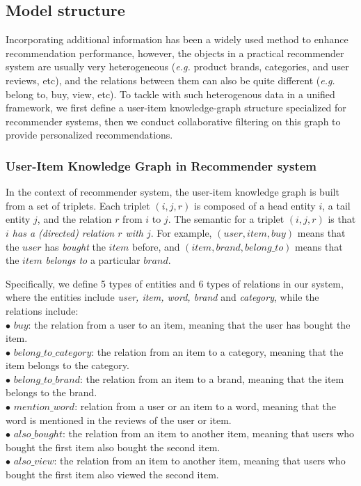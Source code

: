 \documentclass[algorithms,article,accept,moreauthors,pdftex,10pt,a4paper]{Definitions/mdpi}
\begin{document}
\subsection{Model structure}
Incorporating additional information has been a widely used method to enhance recommendation performance, however, the objects in a practical recommender system are usually very heterogeneous (\emph{e.g.} product brands, categories, and user reviews, etc), and the relations between them can also be quite different (\emph{e.g.} belong to, buy, view, etc).
To tackle with such heterogenous data in a unified framework, we first define a user-item knowledge-graph structure specialized for recommender systems, then we conduct collaborative filtering on this graph to provide personalized recommendations.  

\subsubsection{User-Item Knowledge Graph in Recommender system}
In the context of recommender system, the user-item knowledge graph is built from a set of triplets. Each triplet $(i,j,r)$ is composed of a head entity $i$, a tail entity $j$, and the relation $r$ from $i$ to $j$. The semantic for a triplet $(i,j,r)$ is that \emph{$i$ has a (directed) relation $r$ with $j$}. For example, $(user, item, buy)$ means that the \emph{$user$} has \emph{bought} the \emph{$item$} before, and $(item, brand, belong\_to)$ means that the $item$ \textit{belongs to} a particular $brand$.

Specifically, we define 5 types of entities and 6 types of relations in our system, where the entities include \textit{user, item, word, brand} and \textit{category}, 
while the relations include:\\
$\bullet$ $buy$: the relation from a user to an item, meaning that the user has bought the item.\\
$\bullet$ $belong\_to\_category$: the relation from an item to a category, meaning that the item belongs to the category.\\
$\bullet$ $belong\_to\_brand$: the relation from an item to a brand, meaning that the item belongs to the brand.\\
$\bullet$ $mention\_word$: relation from a user or an  item to a word, meaning that the word is mentioned in the reviews of the user or item.\\
$\bullet$ $also\_bought$: the relation from an item to another item, meaning that users who bought the first item also bought the second item.\\
$\bullet$ $also\_view$: the relation from an item to another item, meaning that users who bought the first item also viewed the second item.\\
\end{document}

